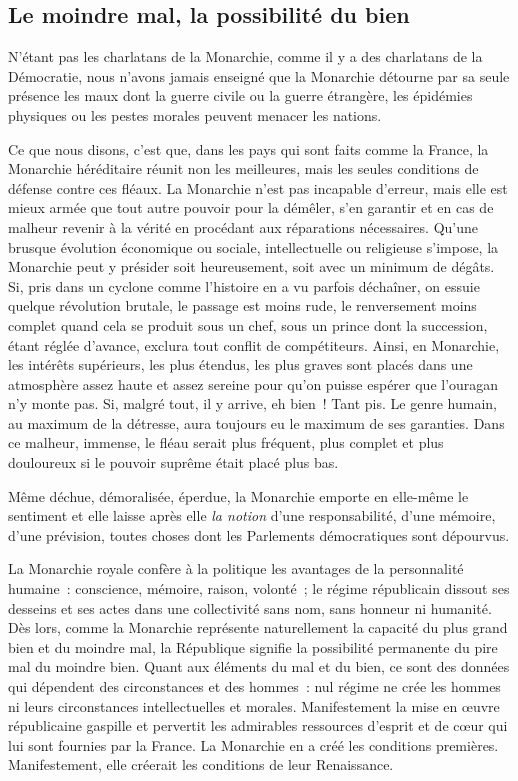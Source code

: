 \documentclass[french,twoside]{book} %
\newcommand{\astermono}{\medskip\centerline{\color{rubric}\large\selectfont{\syms ✻}}\medskip\par}%
\begin{document}
\subsection[{Le moindre mal, la possibilité du bien}]{Le moindre mal, la possibilité du bien}
\noindent N’étant pas les charlatans de la Monarchie, comme il y a des charlatans de la Démocratie, nous n’avons jamais enseigné que la Monarchie détourne par sa seule présence les maux dont la guerre civile ou la guerre étrangère, les épidémies physiques ou les pestes morales peuvent menacer les nations.\par
Ce que nous disons, c’est que, dans les pays qui sont faits comme la France, la Monarchie héréditaire réunit non les meilleures, mais les seules conditions de défense contre ces fléaux. La Monarchie n’est pas incapable d’erreur, mais elle est mieux armée que tout autre pouvoir pour la démêler, s’en garantir et en cas de malheur revenir à la vérité en procédant aux réparations nécessaires. Qu’une brusque évolution économique ou sociale, intellectuelle ou religieuse s’impose, la Monarchie peut y présider soit heureusement, soit avec un minimum de dégâts. Si, pris dans un cyclone comme l’histoire en a vu parfois déchaîner, on essuie quelque révolution brutale, le passage est moins rude, le renversement moins complet quand cela se produit sous un chef, sous un prince dont la succession, étant réglée d’avance, exclura tout conflit de compétiteurs. Ainsi, en Monarchie, les intérêts supérieurs, les plus étendus, les plus graves sont placés dans une atmosphère assez haute et assez sereine pour qu’on puisse espérer que l’ouragan n’y monte pas. Si, malgré tout, il y arrive, eh bien ! Tant pis. Le genre humain, au maximum de la détresse, aura toujours eu le maximum de ses garanties. Dans ce malheur, immense, le fléau serait plus fréquent, plus complet et plus douloureux si le pouvoir suprême était placé plus bas.\par

\astermono

\noindent Même déchue, démoralisée, éperdue, la Monarchie emporte en elle-même le sentiment et elle laisse après elle \emph{la notion} d’une responsabilité, d’une mémoire, d’une prévision, toutes choses dont les Parlements démocratiques sont dépourvus.\par
La Monarchie royale confère à la politique les avantages de la personnalité humaine : conscience, mémoire, raison, volonté ; le régime républicain dissout ses desseins et ses actes dans une collectivité sans nom, sans honneur ni humanité. Dès lors, comme la Monarchie représente naturellement la capacité du plus grand bien et du moindre mal, la République signifie la possibilité permanente du pire mal du moindre bien. Quant aux éléments du mal et du bien, ce sont des données qui dépendent des circonstances et des hommes : nul régime ne crée les hommes ni leurs circonstances intellectuelles et morales. Manifestement la mise en œuvre républicaine gaspille et pervertit les admirables ressources d’esprit et de cœur qui lui sont fournies par la France. La Monarchie en a créé les conditions premières. Manifestement, elle créerait les conditions de leur Renaissance.\par
\end{document}
